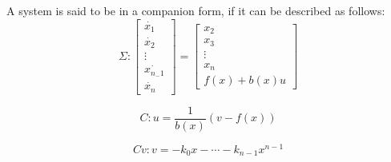 {
    A system is said to be in a companion form, if it can be described as follows:
    \begin{equation}
        \label{FL:dfn_1}
        \Sigma : \begin{bmatrix}
             \dot{x_1}  \\
             \dot{x_2}\\
             \vdots\\
             \dot{x_{n_-1}}\\
             \dot{x_{n}}
        \end{bmatrix}
        = \begin{bmatrix}
            x_2  \\
            x_3  \\
             \vdots\\
            x_n  \\
            f(x)+b(x)u  
        \end{bmatrix}
    \end{equation}

    \begin{equation}
        \label{FL:dfn_2}
        C :  u = \frac{1}{b(x)}(v-f(x))
    \end{equation}

    \begin{equation}
        \label{FL:dfn_3}
        Cv :  v = -k_0x-\cdots -k_{n-1}x^{n-1}
    \end{equation}

}
